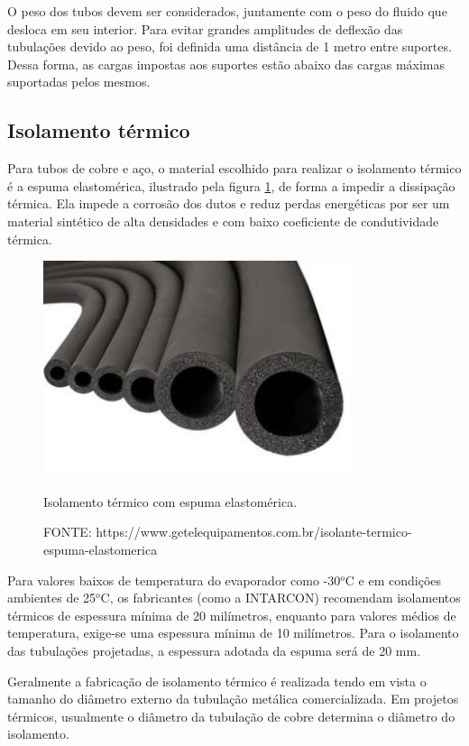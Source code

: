 \documentclass[10pt,a4paper]{article}
\begin{document}
O peso dos tubos devem ser considerados, juntamente com o peso do fluido que desloca em seu interior. Para evitar grandes amplitudes de deflexão das tubulações devido ao peso, foi definida uma distância de 1 metro entre suportes. Dessa forma, as cargas impostas aos suportes estão abaixo das cargas máximas suportadas pelos mesmos.

\subsection{{Isolamento térmico}} 

Para tubos de cobre e aço, o material escolhido para realizar o isolamento térmico é a espuma elastomérica, ilustrado pela figura \ref{fig:espuma}, de forma a impedir a dissipação térmica. Ela impede a corrosão dos dutos e reduz perdas energéticas por ser um material sintético de alta densidades e com baixo coeficiente de condutividade térmica.

\begin{figure}[h!]
    \centering
    \vspace{0.8mm}
    \includegraphics[width=9cm]{Figuras/espumaelastomerica.jpg}
    \caption{Isolamento térmico com espuma elastomérica.}
    \caption*{FONTE: https://www.getelequipamentos.com.br/isolante-termico-espuma-elastomerica}
    \label{fig:espuma}
\end{figure}

Para valores baixos de temperatura do evaporador como -30$^o$C e em condições ambientes de 25$^o$C, os fabricantes (como a INTARCON) recomendam isolamentos térmicos de espessura mínima de 20 milímetros, enquanto para valores médios de temperatura, exige-se uma espessura mínima de 10 milímetros. Para o isolamento das tubulações projetadas,  a espessura adotada da espuma será de 20 mm. 

Geralmente a fabricação de isolamento térmico é realizada tendo em vista o tamanho do diâmetro externo da tubulação metálica comercializada. Em projetos térmicos, usualmente o diâmetro da tubulação de cobre determina o diâmetro do isolamento.
\end{document}
